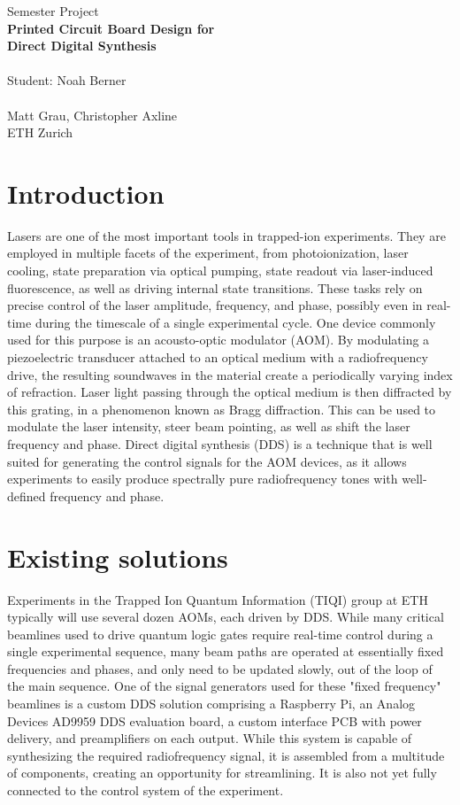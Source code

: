 \documentclass[10pt]{article}
\begin{document}
\begingroup
\centering
{\Large Semester Project}\\
\LARGE \textbf{
	Printed Circuit Board Design for\\
	Direct Digital Synthesis
}\\~\\
\Large Student: Noah Berner~\\~\\

\large Matt Grau, Christopher Axline\\
ETH Zurich\\
{
\centering
}
\endgroup

\section*{Introduction}
Lasers are one of the most important tools in trapped-ion experiments.
They are employed in multiple facets of the experiment, from photoionization, laser cooling, state preparation via optical pumping,  state readout via laser-induced fluorescence, as well as driving internal state transitions.
These tasks rely on precise control of the laser amplitude, frequency, and phase, possibly even in real-time during the timescale of a single experimental cycle. %
One device commonly used for this purpose is an acousto-optic modulator (AOM).
By modulating a piezoelectric transducer attached to an optical medium with a radiofrequency drive, the resulting soundwaves in the material create a periodically varying index of refraction.
Laser light passing through the optical medium is then diffracted by this grating, in a phenomenon known as Bragg diffraction.
This can be used to modulate the laser intensity, steer beam pointing, as well as shift the laser frequency and phase.
Direct digital synthesis (DDS) is a technique that is well suited for generating the control signals for the AOM devices, as it allows experiments to easily produce spectrally pure radiofrequency tones with well-defined frequency and phase.

\section*{Existing solutions}
Experiments in the Trapped Ion Quantum Information (TIQI) group at ETH typically will use several dozen AOMs, each driven by DDS.
While many critical beamlines used to drive quantum logic gates require real-time control during a single experimental sequence, many beam paths are operated at essentially fixed frequencies and phases, and only need to be updated slowly, out of the loop of the main sequence.
One of the signal generators used for these "fixed frequency" beamlines is a custom DDS solution comprising a Raspberry Pi, an Analog Devices AD9959 DDS evaluation board, a custom interface PCB with power delivery, and preamplifiers on each output.
While this system is capable of synthesizing the required radiofrequency signal, it is assembled from a multitude of components, creating an opportunity for streamlining.
It is also not yet fully connected to the control system of the experiment.
\end{document}
